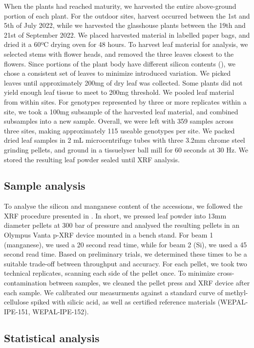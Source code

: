 \documentclass[12pt, letterpaper, ]{report}
\begin{document}
When the plants had reached maturity, we harvested the entire above-ground portion of each plant. For the outdoor sites, harvest occurred between the 1st and 5th of July 2022, while we harvested the glasshouse plants between the 19th and 21st of September 2022. We placed harvested material in labelled paper bags, and dried it a 60ºC drying oven for 48 hours. To harvest leaf material for analysis, we selected stems with flower heads, and removed the three leaves closest to the flowers. Since portions of the plant body have different silicon contents (\cite{dai_genetic_2005}), we chose a consistent set of leaves to minimize introduced variation. We picked leaves until approximately 200mg of dry leaf was collected. Some plants did not yield enough leaf tissue to meet to 200mg threshold. We pooled leaf material from within sites. For genotypes represented by three or more replicates within a site, we took a 100mg subsample of the harvested leaf material, and combined subsamples into a new sample. Overall, we were left with 359 samples across three sites, making approximately 115 useable genotypes per site. We packed dried leaf samples in 2 mL microcentrifuge tubes with three 3.2mm chrome steel grinding pellets, and ground in a tissuelyser ball mill for 60 seconds at 30 Hz. We stored the resulting leaf powder sealed until XRF analysis.  

\subsection{Sample analysis}

To analyse the silicon and manganese content of the accessions, we followed the XRF procedure presented in \textcite{reidinger_rapid_2012}. In short, we pressed leaf powder into 13mm diameter pellets at 300 bar of pressure and analysed the resulting pellets in an Olympus Vanta p-XRF device mounted in a bench stand. For beam 1 (manganese), we used a 20 second read time, while for beam 2 (Si), we used a 45 second read time. Based on preliminary trials, we determined these times to be a suitable trade-off between throughput and accuracy. For each pellet, we took two technical replicates, scanning each side of the pellet once. To minimize cross-contamination between samples, we cleaned the pellet press and XRF device after each sample. We calibrated our measurments against a standard curve of methyl-cellulose spiked with silicic acid, as well as certified reference materials (WEPAL-IPE-151, WEPAL-IPE-152).

\subsection{Statistical analysis}
\end{document}
